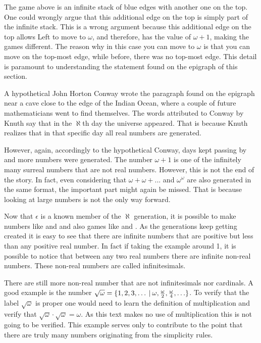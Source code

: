 The game above is an infinite stack of blue edges with another one on the top. One could wrongly argue that this additional edge on the top is simply part of the infinite stack. This is a wrong argument because this additional edge on the top allows Left to move to $\omega$, and therefore, has the value of $\omega+1$, making the games different. The reason why in this case you can move to $\omega$ is that you can move on the top-most edge, while before, there was no top-most edge. This detail is paramount to understanding the statement found on the epigraph of this section.

A hypothetical John Horton Conway wrote the paragraph found on the epigraph near a cave close to the edge of the Indian Ocean, where a couple of future mathematicians went to find themselves. The words attributed to Conway by Knuth say that in the $\aleph$th day the universe appeared. That is because Knuth realizes that in that specific day all real numbers are generated.

However, again, accordingly to the hypothetical Conway, days kept passing by and more numbers were generated. The number $\omega+1$ is one of the infinitely many surreal numbers that are not real numbers. However, this is not the end of the story. In fact, even considering that $\omega + \omega + ...$ and $\omega^\omega$ are also generated in the same format, the important part might again be missed. That is because looking at large numbers is not the only way forward.

Now that $\epsilon$ is a known member of the $\aleph$ generation, it is possible to make numbers like  and  and also games like  and . As the generations keep getting created it is easy to see that there are infinite numbers that are positive but less than any positive real number. In fact if taking the example around 1, it is possible to notice that between any two real numbers there are infinite non-real numbers. These non-real numbers are called infinitesimals.

There are still more non-real number that are not infinitesimals nor cardinals. A good example is the number $\sqrt{\omega} = \mbox{$\{1,2,3,\ldots\:|\:\omega, \frac{\omega}{2},\frac{\omega}{4},\ldots\}$}$. To verify that the label $\sqrt{\omega}$ is proper one would need to learn the definition of multiplication and verify that $\sqrt{\omega} \cdot \sqrt{\omega} = \omega$. As this text makes no use of multiplication this is not going to be verified. This example serves only to contribute to the point that there are truly many numbers originating from the simplicity rules.

